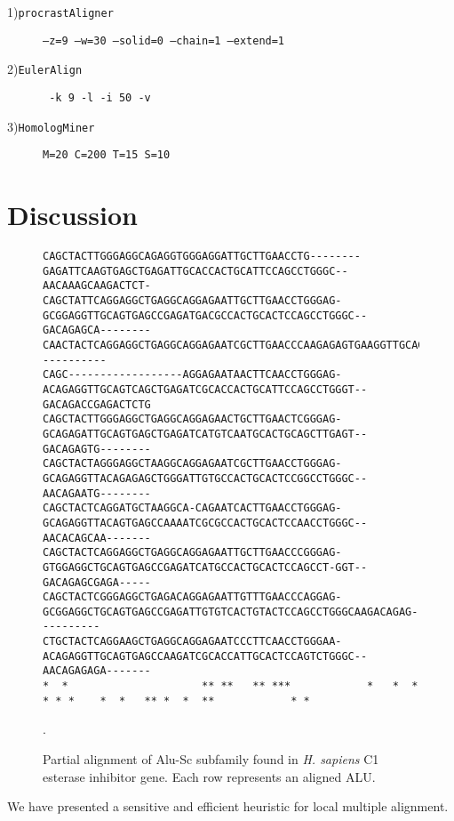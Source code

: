 \documentclass[twoside,11pt]{article}
\begin{document}
\begin{center}
\begin{description}
\item[1)\texttt{procrastAligner}] \texttt{--z=9 --w=30  --solid=0 --chain=1  --extend=1}
\item[2)\texttt{EulerAlign}]     \texttt{ -k 9 -l -i 50 -v}
\item[3)\texttt{HomologMiner}]    \texttt{M=20 C=200 T=15 S=10}

\end{description}
\end{center}
\section{Discussion}

\begin{figure}[t]
\scriptsize
\begin{verbatim}
CAGCTACTTGGGAGGCAGAGGTGGGAGGATTGCTTGAACCTG--------GAGATTCAAGTGAGCTGAGATTGCACCACTGCATTCCAGCCTGGGC--AACAAAGCAAGACTCT-
CAGCTATTCAGGAGGCTGAGGCAGGAGAATTGCTTGAACCTGGGAG-GCGGAGGTTGCAGTGAGCCGAGATGACGCCACTGCACTCCAGCCTGGGC--GACAGAGCA--------
CAACTACTCAGGAGGCTGAGGCAGGAGAATCGCTTGAACCCAAGAGAGTGAAGGTTGCAGTGAGCTGAGATCATGCCACTTCACTCCAGCCTGAGTGAAACAGC-----------
CAGC------------------AGGAGAATAACTTCAACCTGGGAG-ACAGAGGTTGCAGTCAGCTGAGATCGCACCACTGCATTCCAGCCTGGGT--GACAGACCGAGACTCTG
CAGCTACTTGGGAGGCTGAGGCAGGAGAACTGCTTGAACTCGGGAG-GCAGAGATTGCAGTGAGCTGAGATCATGTCAATGCACTGCAGCTTGAGT--GACAGAGTG--------
CAGCTACTAGGGAGGCTAAGGCAGGAGAATCGCTTGAACCTGGGAG-GCAGAGGTTACAGAGAGCTGGGATTGTGCCACTGCACTCCGGCCTGGGC--AACAGAATG--------
CAGCTACTCAGGATGCTAAGGCA-CAGAATCACTTGAACCTGGGAG-GCAGAGGTTACAGTGAGCCAAAATCGCGCCACTGCACTCCAACCTGGGC--AACACAGCAA-------
CAGCTACTCAGGAGGCTGAGGCAGGAGAATTGCTTGAACCCGGGAG-GTGGAGGCTGCAGTGAGCCGAGATCATGCCACTGCACTCCAGCCT-GGT--GACAGAGCGAGA-----
CAGCTACTCGGGAGGCTGAGACAGGAGAATTGTTTGAACCCAGGAG-GCGGAGGCTGCAGTGAGCCGAGATTGTGTCACTGTACTCCAGCCTGGGCAAGACAGAG----------
CTGCTACTCAGGAAGCTGAGGCAGGAGAATCCCTTCAACCTGGGAA-ACAGAGGTTGCAGTGAGCCAAGATCGCACCATTGCACTCCAGTCTGGGC--AACAGAGAGA-------
*  *                     ** **   ** ***            *   *  * * * *    *  *   ** *  *  **            * *
\end{verbatim}
\vspace{-0.5cm}
\normalsize
\caption{Partial alignment of Alu-Sc subfamily found in \emph{H. sapiens} C1 esterase inhibitor gene. Each row represents an aligned ALU.}.
\label{fig-align}
\end{figure}
We have presented a sensitive and efficient heuristic for local multiple alignment.
\end{document}
